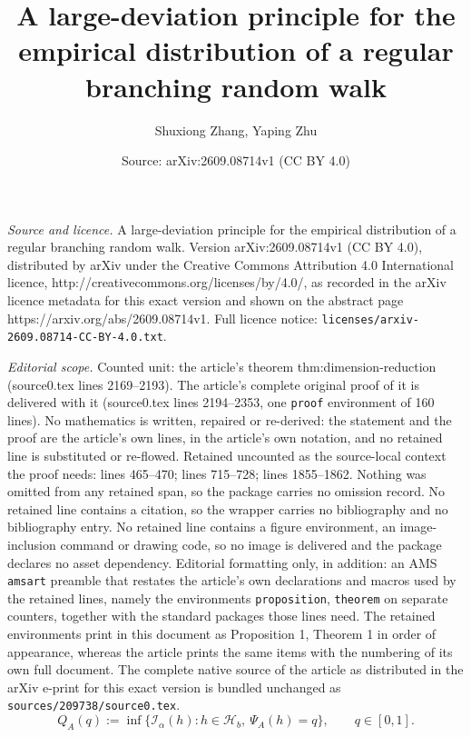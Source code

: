 \documentclass[10pt,a4paper]{amsart}
\title{A large-deviation principle for the empirical distribution of a regular branching random walk}
\author{Shuxiong Zhang, Yaping Zhu}
\date{Source: arXiv:2609.08714v1 (CC BY 4.0)}
\begin{document}
\maketitle

\noindent\emph{Source and licence.} A large-deviation principle for the empirical distribution of a regular branching random walk. Version arXiv:2609.08714v1 (CC BY 4.0), distributed by arXiv under the Creative Commons Attribution 4.0 International licence, http://creativecommons.org/licenses/by/4.0/, as recorded in the arXiv licence metadata for this exact version and shown on the abstract page https://arxiv.org/abs/2609.08714v1. Full licence notice: \texttt{licenses/arxiv-2609.08714-CC-BY-4.0.txt}.\par\smallskip

\noindent\textit{Editorial scope.} Counted unit: the article's theorem thm:dimension-reduction (source0.tex lines 2169--2193). The article's complete original proof of it is delivered with it (source0.tex lines 2194--2353, one \texttt{proof} environment of 160 lines). No mathematics is written, repaired or re-derived: the statement and the proof are the article's own lines, in the article's own notation, and no retained line is substituted or re-flowed.  Retained uncounted as the source-local context the proof needs: lines 465--470; lines 715--728; lines 1855--1862.  Nothing was omitted from any retained span, so the package carries no omission record.  No retained line contains a citation, so the wrapper carries no bibliography and no bibliography entry.  No retained line contains a figure environment, an image-inclusion command or drawing code, so no image is delivered and the package declares no asset dependency.  Editorial formatting only, in addition: an AMS \texttt{amsart} preamble that restates the article's own declarations and macros used by the retained lines, namely the environments \texttt{proposition}, \texttt{theorem} on separate counters, together with the standard packages those lines need.  The retained environments print in this document as Proposition 1, Theorem 1 in order of appearance, whereas the article prints the same items with the numbering of its own full document.  The complete native source of the article as distributed in the arXiv e-print for this exact version is bundled unchanged as \texttt{sources/209738/source0.tex}.
\begin{equation}\label{eq:QA}
  Q_A(q)
  :=
  \inf\{\mathcal{I_{\alpha}}(h):h\in\mathcal{H}_b,\ \Psi_A(h)=q\},
  \qquad q\in[0,1].
\end{equation}
\end{document}
